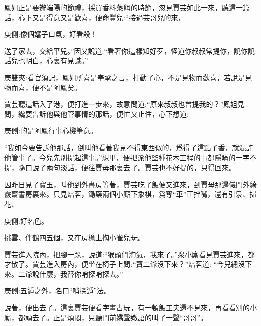 \begin{parag}
    鳳姐正是要辦端陽的節禮，採買香料藥餌的時節，忽見賈芸如此一來，聽這一篇話，心下又是得意又是歡喜，便命豐兒:“接過芸哥兒的來，\begin{note}庚側:像個嬸子口氣，好看殺！\end{note}送了家去，交給平兒。”因又說道:“看著你這樣知好歹，怪道你叔叔常提你，說你說話兒也明白，心裏有見識。”\begin{note}庚雙夾:看官須記，鳳姐所喜是奉承之言，打動了心，不是見物而歡喜，若說是見物而喜，便不是阿鳳矣。\end{note}賈芸聽這話入了港，便打進一步來，故意問道:“原來叔叔也曾提我的？”鳳姐見問，纔要告訴他與他管事情的那話，便忙又止住，心下想道:\begin{note}庚側:的是阿鳳行事心機筆意。\end{note}“我如今要告訴他那話，倒叫他看著我見不得東西似的，爲得了這點子香，就混許他管事了。今兒先別提起這事。”想畢，便把派他監種花木工程的事都隱瞞的一字不提，隨口說了兩句淡話，便往賈母那裏去了。賈芸也不好提的，只得回來。
\end{parag}


\begin{parag}
    因昨日見了寶玉，叫他到外書房等著，賈芸吃了飯便又進來，到賈母那邊儀門外綺霰齋書房裏來。只見焙茗，鋤藥兩個小廝下象棋，爲奪“車”正拌嘴，還有引泉、掃花、\begin{note}庚側:好名色。\end{note}挑雲、伴鶴四五個，又在房檐上掏小雀兒玩。
\end{parag}


\begin{parag}
    賈芸進入院內，把腳一跺，說道:“猴頭們淘氣，我來了。”衆小廝看見賈芸進來，都才散了。賈芸進入房內，便坐在椅子上問:“寶二爺沒下來？”焙茗道: “今兒總沒下來。二爺說什麼，我替你哨探哨探去。”\begin{note}庚側:五遁之外，名曰“哨探遁”法。\end{note}說著，便出去了。這裏賈芸便看字畫古玩，有一頓飯工夫還不見來，再看看別的小廝，都頑去了。正是煩悶，只聽門前嬌聲嫩語的叫了一聲“哥哥”。
\end{parag}


